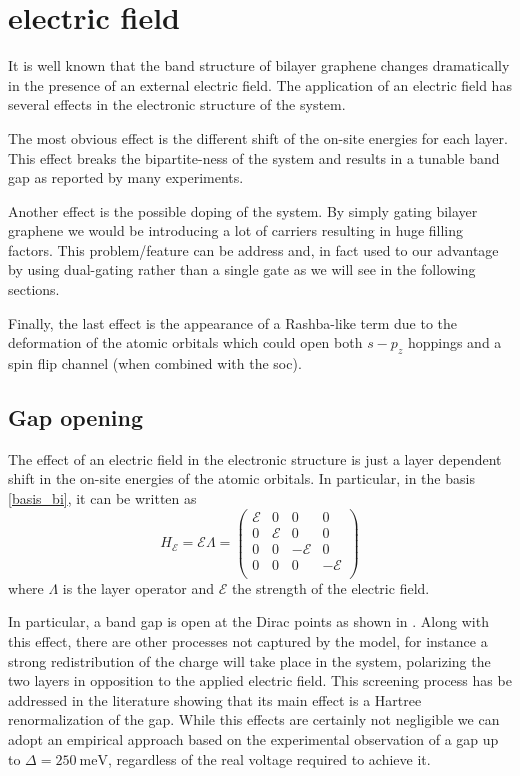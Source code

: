 \section{electric field}
It is well known that the band structure of bilayer graphene changes dramatically in the presence of an external electric field\cite{McCann2006, Castro2007, Oostinga2007, Zhang2009, Taychatanapat2010, Castro2010a, Ponomarenko2011, Allen2012, Sui2015}.
The application of an electric field has several effects in the electronic structure of the system.

The most obvious effect is the different shift of the on-site energies for each layer. This effect breaks the bipartite-ness of the system and results in a tunable band gap as reported by many experiments.

Another effect is the possible doping of the system. By simply gating bilayer graphene we would be introducing a lot of carriers resulting in huge filling factors. This problem/feature can be address and, in fact used to our advantage by using dual-gating rather than a single gate as we will see in the following sections.

Finally, the last effect is the appearance of a Rashba-like term due to the deformation of the atomic orbitals which could open both $s-p_z$ hoppings and a spin flip channel (when combined with the \ac{soc}).


\subsection{Gap opening}
The effect of an electric field in the electronic structure is just a layer dependent shift in the on-site energies of the atomic orbitals. In particular, in the basis \eqref{basis_bi}, it can be written as
\begin{equation}
   H_\mathcal{E} = \mathcal{E}\Lambda = \left(
   \begin{array}{cc|cc}
     \mathcal{E} & 0 & 0 & 0\\
     0 & \mathcal{E} & 0 & 0\\ \hline
     0 & 0 & -\mathcal{E} & 0\\
     0 & 0 & 0 & -\mathcal{E}\\
   \end{array}\right)
\label{Helec}
\end{equation}
where $\Lambda$ is the layer operator and $\mathcal{E}$ the strength of the electric field.

In particular, a band gap is open at the Dirac points as shown in . Along with this effect, there are other processes not captured by the model, for instance a strong redistribution of the charge will take place in the system, polarizing the two layers in opposition to the applied electric field. This screening process has be addressed in the literature showing that its main effect is a Hartree renormalization of the gap\cite{McCann2006,Wang2016a}. While this effects are certainly not negligible we can adopt an empirical approach based on the experimental observation\cite{Zhang2009, Taychatanapat2010} of a gap up to $\Delta=\SI{250}{\meV}$, regardless of the real voltage required to achieve it.



